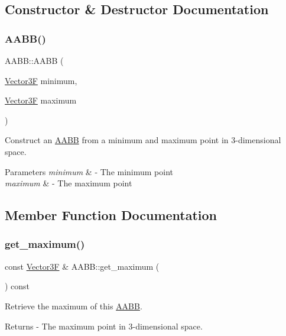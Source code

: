 \subsection{Constructor \& Destructor Documentation}
\mbox{\label{class_a_a_b_b_a12dd0a1fb58f12ee747de9783fcc159f}} 
\subsubsection{\texorpdfstring{A\+A\+B\+B()}{AABB()}}
{\footnotesize\ttfamily A\+A\+B\+B\+::\+A\+A\+BB (\begin{DoxyParamCaption}\item[{\mbox{\hyperlink{class_vector3}{Vector3F}}}]{minimum,  }\item[{\mbox{\hyperlink{class_vector3}{Vector3F}}}]{maximum }\end{DoxyParamCaption})}

Construct an \mbox{\hyperlink{class_a_a_b_b}{A\+A\+BB}} from a minimum and maximum point in 3-\/dimensional space. 
\begin{DoxyParams}{Parameters}
{\em minimum} & -\/ The minimum point \\
\hline
{\em maximum} & -\/ The maximum point \\
\hline
\end{DoxyParams}


\subsection{Member Function Documentation}
\mbox{\label{class_a_a_b_b_a79e383c8e3010cdd1134aca704de030b}} 
\subsubsection{\texorpdfstring{get\+\_\+maximum()}{get\_maximum()}}
{\footnotesize\ttfamily const \mbox{\hyperlink{class_vector3}{Vector3F}} \& A\+A\+B\+B\+::get\+\_\+maximum (\begin{DoxyParamCaption}{ }\end{DoxyParamCaption}) const}

Retrieve the maximum of this \mbox{\hyperlink{class_a_a_b_b}{A\+A\+BB}}. \begin{DoxyReturn}{Returns}
-\/ The maximum point in 3-\/dimensional space. 
\end{DoxyReturn}
\mbox{\label{class_a_a_b_b_a4d2bc2fc98412ad6160c4104f0aeb983}} 
